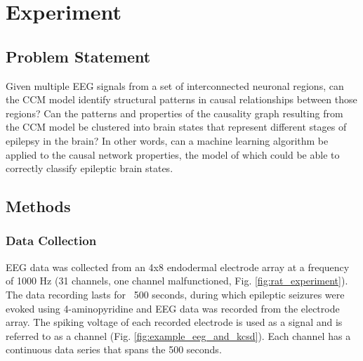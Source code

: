\section{Experiment}
\subsection{Problem Statement}
Given multiple EEG signals from a set of interconnected neuronal regions, can the CCM model identify structural patterns in causal relationships between those regions? Can the patterns and properties of the causality graph resulting from the CCM model be clustered into brain states that represent different stages of epilepsy in the brain? In other words, can a machine learning algorithm be applied to the causal network properties, the model of which could be able to correctly classify epileptic brain states.

\subsection{Methods}
\subsubsection{Data Collection}
EEG data was collected from an 4x8 endodermal electrode array at a frequency of 1000 Hz (31 channels, one channel malfunctioned, Fig. \ref{fig:rat_experiment}). The data recording lasts for ~500 seconds, during which epileptic seizures were evoked using 4-aminopyridine and EEG data was recorded from the electrode array. The spiking voltage of each recorded electrode is used as a signal and is referred to as a channel (Fig. \ref{fig:example_eeg_and_kcsd}). Each channel has a continuous data series that spans the 500 seconds.


